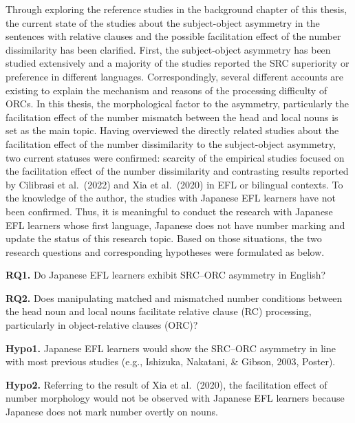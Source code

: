 \documentclass[
]{article}
\begin{document}
Through exploring the reference studies in the background chapter of
this thesis, the current state of the studies about the subject-object
asymmetry in the sentences with relative clauses and the possible
facilitation effect of the number dissimilarity has been clarified.
First, the subject-object asymmetry has been studied extensively and a
majority of the studies reported the SRC superiority or preference in
different languages. Correspondingly, several different accounts are
existing to explain the mechanism and reasons of the processing
difficulty of ORCs. In this thesis, the morphological factor to the
asymmetry, particularly the facilitation effect of the number mismatch
between the head and local nouns is set as the main topic. Having
overviewed the directly related studies about the facilitation effect of
the number dissimilarity to the subject-object asymmetry, two current
statuses were confirmed: scarcity of the empirical studies focused on
the facilitation effect of the number dissimilarity and contrasting
results reported by Cilibrasi et al.~(2022) and Xia et al.~(2020) in EFL
or bilingual contexts. To the knowledge of the author, the studies with
Japanese EFL learners have not been confirmed. Thus, it is meaningful to
conduct the research with Japanese EFL learners whose first language,
Japanese does not have number marking and update the status of this
research topic. Based on those situations, the two research questions
and corresponding hypotheses were formulated as below.

\vspace{1em}

\noindent \textbf{RQ1.} Do Japanese EFL learners exhibit SRC--ORC
asymmetry in English?

\vspace{0.5em}

\noindent \textbf{RQ2.} Does manipulating matched and mismatched number
conditions between the head noun and local nouns facilitate relative
clause (RC) processing, particularly in object-relative clauses (ORC)?

\vspace{0.5em}

\noindent \textbf{Hypo1.} Japanese EFL learners would show the SRC--ORC
asymmetry in line with most previous studies (e.g., Ishizuka, Nakatani,
\& Gibson, 2003, Poster).

\vspace{0.5em}

\noindent \textbf{Hypo2.} Referring to the result of Xia et al.~(2020),
the facilitation effect of number morphology would not be observed with
Japanese EFL learners because Japanese does not mark number overtly on
nouns.
\end{document}
